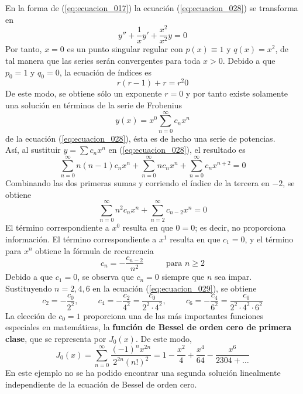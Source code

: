En la forma de (\ref{eq:ecuacion_017}) la ecuación (\ref{eq:ecuacion_028}) se transforma en
\[ y'' + \dfrac{1}{x} y ' + \dfrac{x^{2}}{x^{2}} y = 0 \]
Por tanto, $x = 0$ es un punto singular regular con $p(x) \equiv 1$ y $q(x) = x^{2}$, de tal manera que las series serán convergentes para toda $x > 0$. Debido a que $p_{0} = 1$ y $q_{0} = 0$, la ecuación de índices es
\[ r(r - 1) + r = r^{2} 0 \]
De este modo, se obtiene sólo un exponente $r = 0$ y por tanto existe solamente una solución en términos de la serie de Frobenius
\[ y(x) = x^{0} \sum_{n=0}^{\infty} c_{n} x^{n} \]
de la ecuación (\ref{eq:ecuacion_028}), ésta es de hecho una serie de potencias.
\\
Así, al sustituir $y= \sum c_{n} x^{n}$ en (\ref{eq:ecuacion_028}), el resultado es
\[ \sum_{n=0}^{\infty} n (n-1) c_{n} x^{n} + \sum_{n=0}^{\infty} n c_{n} x^{n} + \sum_{n=0}^{\infty} c_{n} x^{n+2} = 0 \]
Combinando las dos primeras sumas y corriendo el índice de la tercera en $-2$, se obtiene
\[ \sum_{n=0}^{\infty} n^{2} c_{n} x^{n} + \sum_{n=2}^{\infty} c_{n-2} x^{n} = 0 \]
El término correspondiente a $x^{0}$ resulta en que $0 = 0$; es decir, no proporciona información. El término correspondiente a $x^{1}$ resulta en que $c_{1} = 0$, y el término para $x^{n}$ obtiene la fórmula de recurrencia
\begin{equation}
c_{n} = - \dfrac{c_{n-2}}{n^{2}} \hspace{1cm} \mbox{ para } n \geq 2
\label{eq:ecuacion_029}
\end{equation}
Debido a que $c_{1} = 0$, se observa que $c_{n} = 0$ siempre que $n$ sea impar. Sustituyendo $n = 2, 4, 6$ en la ecuación (\ref{eq:ecuacion_029}), se obtiene
\[ c_{2} = - \dfrac{c_{0}}{2^{2}}, \hspace{1cm} c_{4} = - \dfrac{c_{2}}{4^{2}} = \dfrac{c_{0}}{2^{2} \cdot 4^{2}}, \hspace{1cm} c_{6} = - \dfrac{c_{4}}{6^{2}} = \dfrac{c_{0}}{2^{2} \cdot 4^{2} \cdot 6^{2}} \]
La elección de $c_{0} = 1$ proporciona una de las más importantes funciones especiales en matemáticas, la \textbf{función de Bessel de orden cero de primera clase}, que se representa por $J_{0}(x)$. De este modo,
\begin{equation}
J_{0}(x) = \sum_{n=0}^{\infty} \dfrac{(-1)^{n} x^{2n}}{2^{2n}(n!)^{2}} = 1 - \dfrac{x^{2}}{4} + \dfrac{x^{4}}{64} - \dfrac{x^{6}}{2304 + \ldots}
\label{eq:ecuacion_030}
\end{equation}
En este ejemplo no se ha podido encontrar una segunda solución linealmente independiente de la ecuación de Bessel de orden cero.
